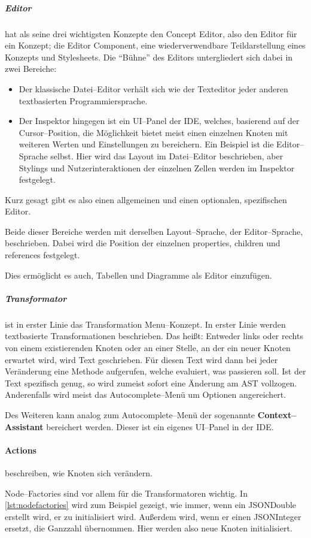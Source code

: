 \subparagraph{Editor} hat als seine drei wichtigsten Konzepte den {\ttfamily Concept Editor}, also den Editor für ein Konzept; die {\ttfamily Editor Component}, eine wiederverwendbare Teildarstellung eines Konzepts und Stylesheets.
Die \enquote{Bühne} des Editors untergliedert sich dabei in zwei Bereiche:
\begin{itemize}
    \item Der klassische Datei--Editor verhält sich wie der Texteditor jeder anderen textbasierten Programmiersprache.
    \item Der Inspektor hingegen ist ein \ac{UI}--Panel der \ac{IDE}, welches, basierend auf der Cursor--Position, die Möglichkeit bietet meist einen einzelnen Knoten mit weiteren Werten und Einstellungen zu bereichern.
    Ein Beispiel ist die Editor--Sprache selbst.
    Hier wird das Layout im Datei--Editor beschrieben, aber Stylings und Nutzerinteraktionen der einzelnen Zellen werden im Inspektor festgelegt.
\end{itemize}
Kurz gesagt gibt es also einen allgemeinen und einen optionalen, spezifischen Editor.

Beide dieser Bereiche werden mit derselben Layout--Sprache, der Editor--Sprache, beschrieben.
Dabei wird die Position der einzelnen {\ttfamily properties}, {\ttfamily children} und {\ttfamily references} festgelegt.

Dies ermöglicht es auch, Tabellen und Diagramme als Editor einzufügen.

\subparagraph{Transformator} ist in erster Linie das {\ttfamily Transformation Menu}--Konzept.
In erster Linie werden textbasierte Transformationen beschrieben.
Das heißt: Entweder links oder rechts von einem existierenden Knoten oder an einer Stelle, an der ein neuer Knoten erwartet wird, wird Text geschrieben.
Für diesen Text wird dann bei jeder Veränderung eine Methode aufgerufen, welche evaluiert, was passieren soll.
Ist der Text spezifisch genug, so wird zumeist sofort eine Änderung am \ac{AST} vollzogen.
Anderenfalls wird meist das Autocomplete--Menü um Optionen angereichert.

Des Weiteren kann analog zum Autocomplete--Menü der sogenannte \textbf{Context--Assistant} bereichert werden.
Dieser ist ein eigenes \acs{UI}--Panel in der \ac{IDE}.

\paragraph{Actions} beschreiben, wie Knoten sich verändern.

{\ttfamily Node--Factories} sind vor allem für die Transformatoren wichtig.
In \autoref{lst:nodefactories} wird zum Beispiel gezeigt, wie immer, wenn ein {\ttfamily JSONDouble} erstellt wird, er zu {} initialisiert wird.
Außerdem wird, wenn er einen {\ttfamily JSONInteger} ersetzt, die Ganzzahl übernommen.
Hier werden also neue Knoten initialisiert.

